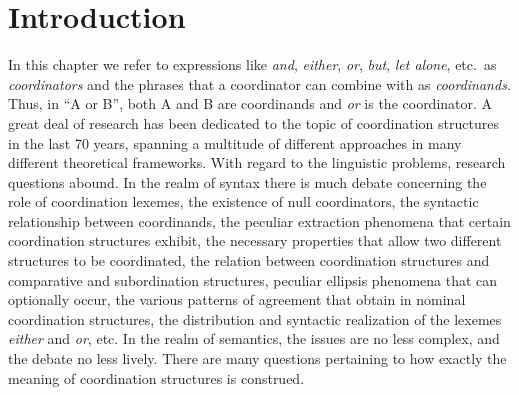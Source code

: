 
\maketitle
\label{chap-coordination}



\section{Introduction} 

In this chapter we refer to expressions like \emph{and}, \emph{either},  \emph{or}, \emph{but}, 
\emph{let alone}, etc.\ as \emph{coordinators} and the phrases that a coordinator can combine with as  \emph{coordinands}.
Thus,  in ``A or B'', both A and B are coordinands and \emph{or} is the coordinator. 
A great deal of research has been dedicated to the topic of coordination structures in the last  70 years, spanning a multitude of different approaches in many different theoretical frameworks.  With regard to the linguistic problems, research questions abound. In the realm of syntax there is much debate concerning the role of coordination lexemes, the existence of null coordinators, the syntactic relationship between coordinands, the peculiar extraction phenomena that certain coordination structures exhibit, the necessary properties that allow two different structures to be coordinated, the relation between coordination structures and comparative and subordination structures, peculiar ellipsis phenomena that can optionally occur, the various patterns of agreement that obtain in nominal coordination structures, the distribution and syntactic realization of the lexemes \emph{either} and \emph{or}, etc. In the realm of semantics, the issues are no less complex, and the debate no less lively. There are many questions pertaining to how exactly the meaning of coordination structures is construed. 

